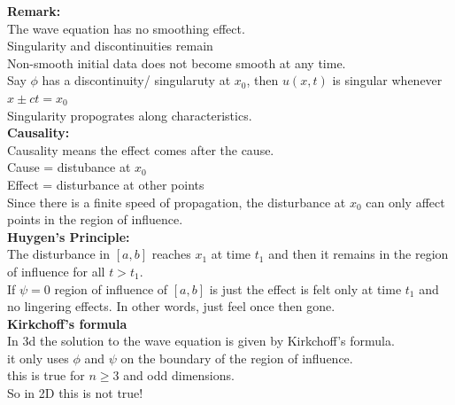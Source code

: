 \documentclass{article}
\begin{document}
\textbf{Remark:} \\
The wave equation has no smoothing effect.\\
Singularity and discontinuities remain \\
Non-smooth initial data does not become smooth at any time.\\
Say $\phi$ has a discontinuity/ singularuty at $x_0$, then $u(x,t)$ is singular whenever $x \pm ct = x_0$\\
Singularity propogrates along characteristics.\\

\textbf{Causality: }\\
Causality means the effect comes after the cause.\\
Cause = distubance at $x_0$\\
Effect = disturbance at other points\\
Since there is a finite speed of propagation, the disturbance at $x_0$ can only affect points in the region of influence.\\

\textbf{Huygen's Principle:} \\
The disturbance in $[a,b]$ reaches $x_1$ at time $t_1$ and then it remains in the region of influence for all $t > t_1$.\\
If $\psi = 0$ region of influence of $[a,b]$ is just the effect is felt only at time $t_1$ and no lingering effects. In other words, just feel once then gone.\\
\textbf{Kirkchoff's formula}\\
In 3d the solution to the wave equation is given by Kirkchoff's formula.\\
it only uses $\phi$ and $\psi$ on the boundary of the region of influence.\\
this is true for $n \geq 3$ and odd dimensions.\\
So in 2D this is not true! 
\end{document}

